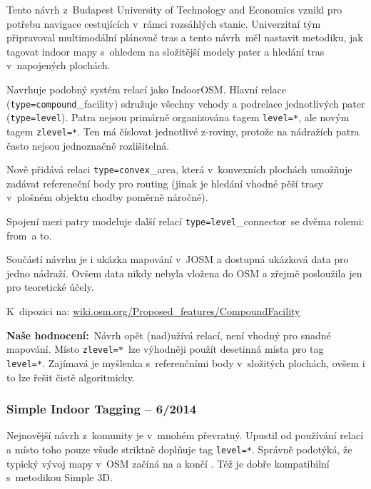 Tento návrh z~Budapest University of Technology and Economics vznikl pro potřebu navigace cestujících v~rámci rozsáhlých stanic. Univerzitní tým připravoval multimodální plánovač tras a tento návrh~měl nastavit metodiku, jak tagovat indoor mapy s~ohledem na složitější modely pater a hledání tras v~napojených plochách.

Navrhuje podobný systém relací jako IndoorOSM. Hlavní relace \\(\texttt{type=compound}\_facility) sdružuje všechny vchody a podrelace jednotlivých pater (\texttt{type=level}). Patra nejsou primárně organizována tagem \texttt{level=*}, ale novým tagem \texttt{zlevel=*}. Ten má číslovat jednotlivé z-roviny, protože na nádražích patra často nejsou jednoznačně rozlišitelná.

Nově přidává relaci \texttt{type=convex}\_area, která v~konvexních plochách umožňuje zadávat refereneční body pro routing (jinak je hledání vhodné pěší trasy v~plošném objektu chodby poměrně náročné).

Spojení mezi patry modeluje další relací \texttt{type=level}\_connector~se dvěma rolemi: from~a to.

Součástí návrhu je i ukázka mapování v~JOSM a dostupná ukázková data pro jedno nádraží. Ovšem data nikdy nebyla vložena do OSM a zřejmě posloužila jen pro teoretické účely.

K~dipozici na: \href{http://wiki.osm.org/Proposed\_features/CompoundFacility}{wiki.osm.org/Proposed\_features/CompoundFacility}

\textbf{Naše hodnocení:}~Návrh opět (nad)užívá relací, není vhodný pro snadné mapování. Místo \texttt{zlevel=*}~lze výhodněji použít desetinná místa pro tag \\ \texttt{level=*}. Zajímavá je myšlenka s~referenčními body v~složitých plochách, ovšem i to lze řešit  čistě algoritmicky.

\subsubsection{Simple Indoor Tagging -- 6/2014}\label{simple-indoor-tagging-62014}

Nejnovější návrh z~komunity je v~mnohém převratný. Upustil od používání relací a místo toho pouze všude striktně doplňuje tag \texttt{level=*}. Správně podotýká, že typický vývoj mapy v~OSM začíná na  a končí . Též je dobře kompatibilní s~metodikou Simple 3D.


